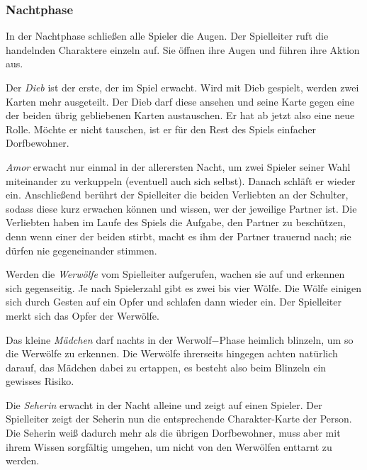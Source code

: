 \documentclass[12pt]{article}
\begin{document}
\subsubsection{Nachtphase}
In der Nachtphase schließen alle Spieler die Augen. Der Spielleiter ruft die handelnden Charaktere einzeln auf. Sie öffnen ihre Augen und führen ihre Aktion aus.

\vspace{0,3 cm}

Der \textit{Dieb} ist der erste, der im Spiel erwacht. Wird mit Dieb gespielt, werden zwei Karten mehr ausgeteilt. Der Dieb darf diese ansehen und seine Karte gegen eine der beiden übrig gebliebenen Karten austauschen. Er hat ab jetzt also eine neue Rolle. Möchte er nicht tauschen, ist er für den Rest des Spiels einfacher Dorfbewohner.

\vspace{0,3 cm}

\textit{Amor} erwacht nur einmal in der allerersten Nacht, um zwei Spieler seiner Wahl miteinander zu
verkuppeln (eventuell auch sich selbst). Danach schläft er wieder ein. Anschließend berührt der
Spielleiter die beiden Verliebten an der Schulter, sodass diese kurz erwachen können und wissen,
wer der jeweilige Partner ist. Die Verliebten haben im Laufe des Spiels die Aufgabe, den Partner
zu beschützen, denn wenn einer der beiden stirbt, macht es ihm der Partner trauernd nach; sie
dürfen nie gegeneinander stimmen.

\vspace{0,3 cm}

Werden die \textit{Werwölfe} vom Spielleiter aufgerufen, wachen sie auf und erkennen sich gegenseitig.
Je nach Spielerzahl gibt es zwei bis vier Wölfe. Die Wölfe einigen sich durch Gesten auf ein Opfer und schlafen dann wieder ein.
Der Spielleiter merkt sich das Opfer der Werwölfe.

\vspace{0,3 cm}

Das kleine \textit{Mädchen} darf nachts in der Werwolf$-$Phase heimlich blinzeln, um so die Werwölfe zu
erkennen. Die Werwölfe ihrerseits hingegen achten natürlich darauf, das Mädchen dabei zu ertappen,
es besteht also beim Blinzeln ein gewisses Risiko.

\vspace{0,3 cm}

Die \textit{Seherin} erwacht in der Nacht alleine und zeigt auf einen Spieler.
Der Spielleiter zeigt der Seherin nun die entsprechende Charakter-Karte der Person.
Die Seherin weiß dadurch mehr als die übrigen Dorfbewohner, muss aber mit ihrem Wissen
sorgfältig umgehen, um nicht von den Werwölfen enttarnt zu werden.
\end{document}
